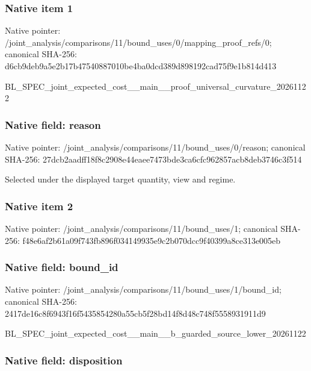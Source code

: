 \documentclass[10pt,a4paper]{article}
\begin{document}
\subsubsection{Native item 1}


Native pointer: /joint\_analysis/comparis\allowbreak{}ons/11/bound\_uses/0/mapp\allowbreak{}ing\_proof\_refs/0; canonical SHA-256: d6cb9deb9a5e2b17b4754088\allowbreak{}7010be4ba0dcd389d898192c\allowbreak{}ad75f9e1b814d413


BL\_SPEC\_joint\_expected\_c\allowbreak{}ost\_\_main\_\_proof\_univers\allowbreak{}al\_curvature\_20261122


\subsubsection{Native field: reason}


Native pointer: /joint\_analysis/comparis\allowbreak{}ons/11/bound\_uses/0/reas\allowbreak{}on; canonical SHA-256: 27dcb2aadff18f8c2908e44e\allowbreak{}aee7473bde3ca6cfc962857a\allowbreak{}cb8deb3746c3f514


Selected under the displayed target quantity, view and regime.


\subsubsection{Native item 2}


Native pointer: /joint\_analysis/comparis\allowbreak{}ons/11/bound\_uses/1; canonical SHA-256: f48e6af2b61a09f743fb896f\allowbreak{}034149935e9c2b070dcc9f40\allowbreak{}399a8ce313e005eb



\subsubsection{Native field: bound\_id}


Native pointer: /joint\_analysis/comparis\allowbreak{}ons/11/bound\_uses/1/boun\allowbreak{}d\_id; canonical SHA-256: 2417de16c8f6943f16f54358\allowbreak{}54280a55cb5f28bd14f8d48c\allowbreak{}748f5558931911d9


BL\_SPEC\_joint\_expected\_c\allowbreak{}ost\_\_main\_\_b\_guarded\_sou\allowbreak{}rce\_lower\_20261122


\subsubsection{Native field: disposition}
\end{document}
